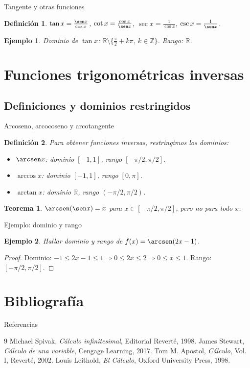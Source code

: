 \documentclass[10pt, spanish]{beamer}
\newtheorem{definicion}{Definición}
\newtheorem{teorema}{Teorema}
\newtheorem{ejemplo}{Ejemplo}
\begin{document}
	\begin{frame}{Tangente y otras funciones}
		\begin{definicion}
			$\tan x = \frac{\sen x}{\cos x}$, $\cot x = \frac{\cos x}{\sen x}$, $\sec x = \frac{1}{\cos x}$, $\csc x = \frac{1}{\sen x}$.
		\end{definicion}
		\begin{ejemplo}
			Dominio de $\tan x$: $\mathbb{R}\setminus\{\frac{\pi}{2}+k\pi,\ k\in\mathbb{Z}\}$. Rango: $\mathbb{R}$.
		\end{ejemplo}
	\end{frame}
	
	\section{Funciones trigonométricas inversas}
	\subsection{Definiciones y dominios restringidos}
	\begin{frame}{Arcoseno, arcocoseno y arcotangente}
		\begin{definicion}
			Para obtener funciones inversas, restringimos los dominios:
			\begin{itemize}
				\item $\arcsen x$: dominio $[-1,1]$, rango $[-\pi/2,\pi/2]$.
				\item $\arccos x$: dominio $[-1,1]$, rango $[0,\pi]$.
				\item $\arctan x$: dominio $\mathbb{R}$, rango $(-\pi/2,\pi/2)$.
			\end{itemize}
		\end{definicion}
		\begin{teorema}
			$\arcsen(\sen x)=x$ para $x\in[-\pi/2,\pi/2]$, pero no para todo $x$.
		\end{teorema}
	\end{frame}
	
	\begin{frame}{Ejemplo: dominio y rango}
		\begin{ejemplo}
			Hallar dominio y rango de $f(x)=\arcsen(2x-1)$.
		\end{ejemplo}
		\begin{proof}
			Dominio: $-1\le 2x-1\le 1 \Rightarrow 0\le 2x\le 2 \Rightarrow 0\le x\le 1$. Rango: $[-\pi/2,\pi/2]$.
		\end{proof}
	\end{frame}
	
	\section{Bibliografía}
	\begin{frame}{Referencias}
		\begin{thebibliography}{9}
			 Michael Spivak, \textit{Cálculo infinitesimal}, Editorial Reverté, 1998.
			 James Stewart, \textit{Cálculo de una variable}, Cengage Learning, 2017.
			 Tom M. Apostol, \textit{Cálculo}, Vol. I, Reverté, 2002.
			 Louis Leithold, \textit{El Cálculo}, Oxford University Press, 1998.
		\end{thebibliography}
	\end{frame}
	
\end{document}
